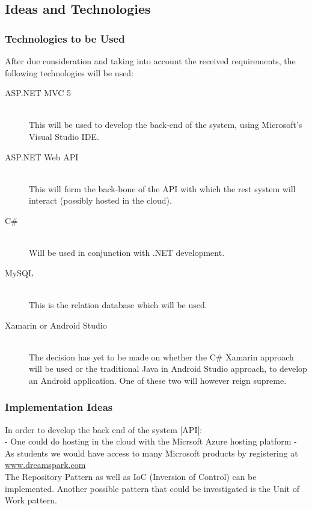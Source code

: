 \subsection{Ideas and Technologies}
\subsubsection{Technologies to be Used}
After due consideration and taking into account the received requirements, the following technologies will be used:
\begin{description}
	\item[ASP.NET MVC 5]\hfill\\
	This will be used to develop the back-end of the system, using Microsoft's Visual Studio IDE.
	\item[ASP.NET Web API]\hfill\\
	This will form the back-bone of the API with which the rest system will interact (possibly hosted in the cloud).
	\item[C\#]\hfill\\
	Will be used in conjunction with .NET development.
	\item[MySQL]\hfill\\	
	This is the relation database which will be used.
	\item[Xamarin or Android Studio]\hfill\\
	The decision has yet to be made on whether the C\# Xamarin approach will be used or the traditional Java in Android Studio approach, to develop an Android application. One of these two will however reign supreme.
	
\end{description}
	
\subsubsection{Implementation Ideas}	
In order to develop the back end of the system [API]:\\
- One could do hosting in the cloud with the Micrsoft Azure hosting platform
- As students we would have access to many Microsoft products by registering at \href{http://www.dreamspark.com}{www.dreamspark.com}\\

The Repository Pattern as well as IoC (Inversion of Control) can be implemented. Another possible pattern that could be investigated is the Unit of Work pattern.\\

